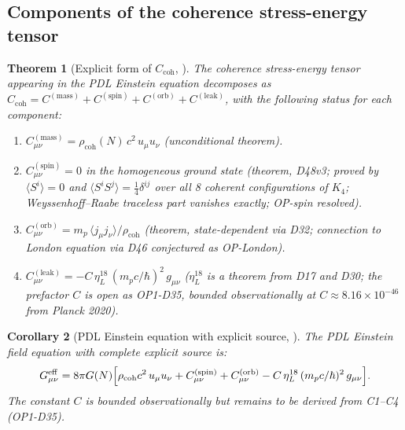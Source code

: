 \documentclass[11pt,a4paper]{article}
\theoremstyle{plain}
\newtheorem{theorem}{Theorem}[section]
\newtheorem{corollary}[theorem]{Corollary}
\theoremstyle{definition}
\theoremstyle{remark}
\newcommand{\rhocoh}{\rho_{\mathrm{coh}}}
\newcommand{\Ccoh}{C_{\mathrm{coh}}}
\begin{document}
\subsection{Components of the coherence stress-energy tensor}
\label{subsec:Ccohcomponents}
\begin{theorem}[Explicit form of $\Ccoh$, \cite{D48}]
\label{thm:Ccoh}
The coherence stress-energy tensor appearing in the PDL Einstein equation decomposes as $\Ccoh = C^{(\mathrm{mass})} + C^{(\mathrm{spin})} + C^{(\mathrm{orb})} + C^{(\mathrm{leak})}$, with the following status for each component:
\begin{enumerate}
\item $C^{(\mathrm{mass})}_{\mu\nu} = \rhocoh(N)\,c^2\,u_\mu u_\nu$ \quad (\textcolor{proofblue}{unconditional theorem}).
\item $C^{(\mathrm{spin})}_{\mu\nu} = 0$ in the homogeneous ground state \quad (\textcolor{proofblue}{theorem}, D48v3; proved by $\langle S^i\rangle=0$ and $\langle S^iS^j\rangle = \tfrac{1}{4}\delta^{ij}$ over all 8 coherent configurations of $K_4$; Weyssenhoff--Raabe traceless part vanishes exactly; OP-spin resolved).
\item $C^{(\mathrm{orb})}_{\mu\nu} = m_p\,\langle j_\mu j_\nu\rangle/\rhocoh$ \quad (\textcolor{proofblue}{theorem}, state-dependent via D32; connection to London equation via D46 conjectured as OP-London).
\item $C^{(\mathrm{leak})}_{\mu\nu} = -C\,\eta_L^{18}\,(m_p c/\hbar)^2\,g_{\mu\nu}$ \quad ($\eta_L^{18}$ is a \textcolor{proofblue}{theorem} from D17 and D30; the prefactor $C$ is \textcolor{openproblemred}{open} as OP1-D35, bounded observationally at $C \approx 8.16\times10^{-46}$ from Planck 2020).
\end{enumerate}
\end{theorem}

\begin{corollary}[PDL Einstein equation with explicit source, \cite{D48}]
\label{cor:EinsteinExplicit}
The PDL Einstein field equation with complete explicit source is:
\begin{equation}
G_{\mu\nu}^{\mathrm{eff}} = 8\pi G(N)\Bigl[\rhocoh c^2\,u_\mu u_\nu + C^{(\mathrm{spin})}_{\mu\nu} + C^{(\mathrm{orb})}_{\mu\nu} - C\,\eta_L^{18}\,(m_p c/\hbar)^2\,g_{\mu\nu}\Bigr].
\end{equation}
The constant $C$ is bounded observationally but remains to be derived from C1--C4 (OP1-D35).
\end{corollary}
\end{document}
